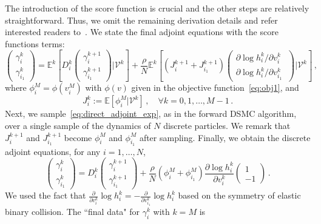 \documentclass[12pt]{amsart}
\newcommand{\cal}{\mathcal}
\begin{document}
The introduction of the score function is crucial and the other steps are relatively straightforward. Thus, we omit the remaining derivation details and refer interested readers to~\cite{yang2023adjoint}. We state the final adjoint equations with the score functions terms:
\begin{equation}\label{eq:direct_adjoint_exp}
    \begin{pmatrix}
    \gamma_i^k\\
    \gamma_{i_1}^k
    \end{pmatrix}
     = \mathbb{E}^k\left[ D_i^k  \begin{pmatrix}
    \gamma_i^{k+1}\\
    \gamma_{i_1}^{k+1}
    \end{pmatrix}  \Big| {\cal V}^k \right]   + \frac{\rho}{N} \mathbb{E}^k\left[ \left( J_{i}^{k+1} + J_{i_1}^{k+1} \right) \begin{pmatrix}
    \partial \log h_i^k /\partial v_i^k\\
    \partial \log h_i^k /\partial v_{i_1}^k\
    \end{pmatrix}  \Big| {\cal V}^k \right]\,,
\end{equation}
where $\phi_i^M = \phi(v_i^M)$ with $\phi(v)$ given in the objective function~\eqref{eq:obj1}, and
\[
J_i^k := \mathbb{E}\left[ \phi_i^M | {\cal V}^k\right]\,,\quad \forall k = 0,1,\ldots, M-1\,.
\]
Next, we sample~\eqref{eq:direct_adjoint_exp}, as in the forward DSMC algorithm, over a single sample of the dynamics of $N$ discrete particles. We remark that $J_{i}^{k+1}$ and $J_{i_1}^{k+1}$ become $\phi_{i}^{M}$ and $\phi_{i_1}^{M}$ after sampling. Finally, we obtain the discrete adjoint equations, for any $i = 1,\ldots, N$, 
\begin{equation}\label{eq:direct_adjoint_sample}
    \begin{pmatrix}
    \gamma_i^k\\
    \gamma_{i_1}^k
    \end{pmatrix}
     =  D_i^k  \begin{pmatrix}
    \gamma_i^{k+1}\\
    \gamma_{i_1}^{k+1}
    \end{pmatrix}   +  \frac{\rho}{N} \left( \phi_{i}^{M} + \phi_{i_1}^{M} \right)  \frac{\partial \log h_i^k }{\partial v_i^k}\begin{pmatrix}
    1\\
    -1
    \end{pmatrix}\,.
\end{equation}
We used the fact that $ \frac{\partial }{\partial v_i^k} \log h_i^k  = - \frac{\partial }{\partial v_{i_1}^k} \log h_{i}^k $ based on the symmetry of elastic binary collision.  The ``final data" for $\gamma_i^k$ with $k=M$ is
\end{document}
